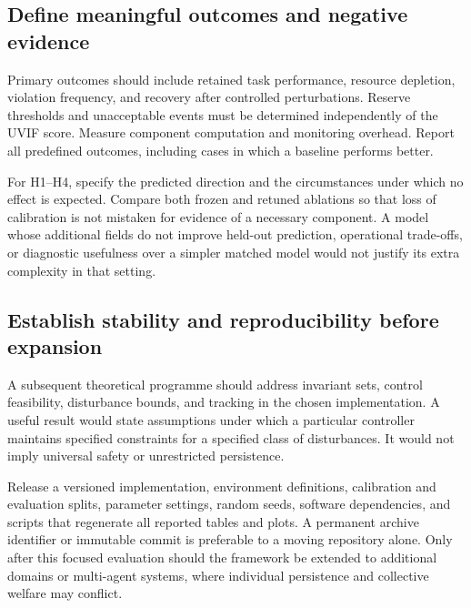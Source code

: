 

\subsection{Define meaningful outcomes and negative evidence}
Primary outcomes should include retained task performance, resource depletion, violation frequency, and recovery after controlled perturbations. Reserve thresholds and unacceptable events must be determined independently of the UVIF score. Measure component computation and monitoring overhead. Report all predefined outcomes, including cases in which a baseline performs better.

For H1--H4, specify the predicted direction and the circumstances under which no effect is expected. Compare both frozen and retuned ablations so that loss of calibration is not mistaken for evidence of a necessary component. A model whose additional fields do not improve held-out prediction, operational trade-offs, or diagnostic usefulness over a simpler matched model would not justify its extra complexity in that setting.

\subsection{Establish stability and reproducibility before expansion}
A subsequent theoretical programme should address invariant sets, control feasibility, disturbance bounds, and tracking in the chosen implementation. A useful result would state assumptions under which a particular controller maintains specified constraints for a specified class of disturbances. It would not imply universal safety or unrestricted persistence.

Release a versioned implementation, environment definitions, calibration and evaluation splits, parameter settings, random seeds, software dependencies, and scripts that regenerate all reported tables and plots. A permanent archive identifier or immutable commit is preferable to a moving repository alone. Only after this focused evaluation should the framework be extended to additional domains or multi-agent systems, where individual persistence and collective welfare may conflict.
